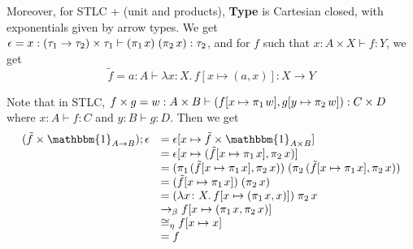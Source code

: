 \documentclass{lecturenotes}
\newcommand{\tabs}[3]{\ensuremath{\lambda #1 \colon #2.\,#3}}
\newcommand{\app}[2]{\ensuremath{#1\;#2}}
\newcommand{\pair}[2]{\ensuremath{(#1, #2)}}
\newcommand{\projl}[1]{\ensuremath{\pi_1\mkern2mu#1}}
\newcommand{\projr}[1]{\ensuremath{\pi_2\mkern3mu#1}}
\newcommand{\id}[1][]{\ensuremath{\mathbbm{1}_{#1}}}
\newcommand{\Type}{\textbf{Type}\xspace}
\begin{document}
Moreover, for STLC + (unit and products), \Type is Cartesian closed, with exponentials given by arrow types.
We get $\epsilon = x : (\tau_1 \to \tau_2) \times \tau_1 \vdash \app{(\projl{x})}{(\projr{x})} : \tau_2$, and for $f$ such that $x : A \times X \vdash f : Y$, we get $$\tilde{f} = a : A \vdash \tabs{x}{X}{f[x \mapsto (a, x)]} : X \to Y$$

Note that in STLC, $f \times g = w : A \times B \vdash \pair{f [x \mapsto \projl{w}]}{g[y \mapsto \projr{w}]} : C \times D$ where $x : A \vdash f : C$ and $y : B \vdash g : D$.
Then we get
$$
\begin{array}{ll}
  (\tilde{f} \times \id[A \to B]); \epsilon &= \epsilon [ x \mapsto \tilde{f} \times \id[A \times B]]\\
                              &= \epsilon [x \mapsto \pair{\tilde{f} [x \mapsto \projl{x}]}{\projr{x}}]\\
                              &=\app{(\projl{\pair{\tilde{f} [x \mapsto \projl{x}]}{\projr{x}}})}{(\projr{\pair{\tilde{f} [x \mapsto \projl{x}]}{\projr{x}}})}\\
                              &=\app{(\tilde{f} [x \mapsto \projl{x}])}{(\projr{x})}\\
                              &=\app{(\tabs{x}{X}{f[x \mapsto \pair{\projl{x}}{x}]})}{\projr{x}}\\
                              &\to_\beta f[x \mapsto \pair{\projl{x}}{\projr{x}}]\\
                              &\cong_\eta f[x \mapsto x]\\
                              &= f
\end{array}
$$
\end{document}
